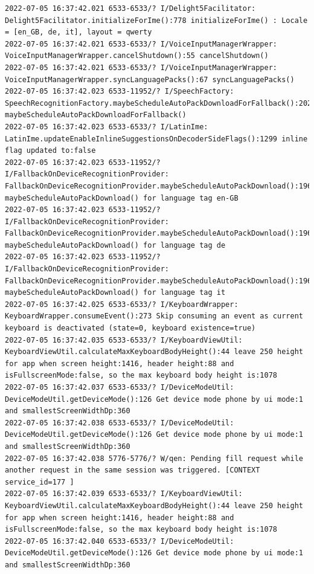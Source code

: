 \documentclass[a4paper,12pt]{book}
\begin{document}
\begin{lstlisting}
2022-07-05 16:37:42.021 6533-6533/? I/Delight5Facilitator: Delight5Facilitator.initializeForIme():778 initializeForIme() : Locale = [en_GB, de, it], layout = qwerty
2022-07-05 16:37:42.021 6533-6533/? I/VoiceInputManagerWrapper: VoiceInputManagerWrapper.cancelShutdown():55 cancelShutdown()
2022-07-05 16:37:42.021 6533-6533/? I/VoiceInputManagerWrapper: VoiceInputManagerWrapper.syncLanguagePacks():67 syncLanguagePacks()
2022-07-05 16:37:42.023 6533-11952/? I/SpeechFactory: SpeechRecognitionFactory.maybeScheduleAutoPackDownloadForFallback():202 maybeScheduleAutoPackDownloadForFallback()
2022-07-05 16:37:42.023 6533-6533/? I/LatinIme: LatinIme.updateEnableInlineSuggestionsOnDecoderSideFlags():1299 inline flag updated to:false
2022-07-05 16:37:42.023 6533-11952/? I/FallbackOnDeviceRecognitionProvider: FallbackOnDeviceRecognitionProvider.maybeScheduleAutoPackDownload():196 maybeScheduleAutoPackDownload() for language tag en-GB
2022-07-05 16:37:42.023 6533-11952/? I/FallbackOnDeviceRecognitionProvider: FallbackOnDeviceRecognitionProvider.maybeScheduleAutoPackDownload():196 maybeScheduleAutoPackDownload() for language tag de
2022-07-05 16:37:42.023 6533-11952/? I/FallbackOnDeviceRecognitionProvider: FallbackOnDeviceRecognitionProvider.maybeScheduleAutoPackDownload():196 maybeScheduleAutoPackDownload() for language tag it
2022-07-05 16:37:42.025 6533-6533/? I/KeyboardWrapper: KeyboardWrapper.consumeEvent():273 Skip consuming an event as current keyboard is deactivated (state=0, keyboard existence=true)
2022-07-05 16:37:42.035 6533-6533/? I/KeyboardViewUtil: KeyboardViewUtil.calculateMaxKeyboardBodyHeight():44 leave 250 height for app when screen height:1416, header height:88 and isFullscreenMode:false, so the max keyboard body height is:1078
2022-07-05 16:37:42.037 6533-6533/? I/DeviceModeUtil: DeviceModeUtil.getDeviceMode():126 Get device mode phone by ui mode:1 and smallestScreenWidthDp:360
2022-07-05 16:37:42.038 6533-6533/? I/DeviceModeUtil: DeviceModeUtil.getDeviceMode():126 Get device mode phone by ui mode:1 and smallestScreenWidthDp:360
2022-07-05 16:37:42.038 5776-5776/? W/qen: Pending fill request while another request in the same session was triggered. [CONTEXT service_id=177 ]
2022-07-05 16:37:42.039 6533-6533/? I/KeyboardViewUtil: KeyboardViewUtil.calculateMaxKeyboardBodyHeight():44 leave 250 height for app when screen height:1416, header height:88 and isFullscreenMode:false, so the max keyboard body height is:1078
2022-07-05 16:37:42.040 6533-6533/? I/DeviceModeUtil: DeviceModeUtil.getDeviceMode():126 Get device mode phone by ui mode:1 and smallestScreenWidthDp:360

\end{lstlisting}
\end{document}
